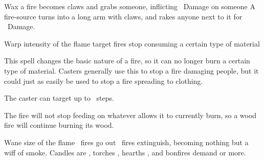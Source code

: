   {\mFire}%
  {Wax}%
  {\detailed}%
  {}%
  {a fire becomes claws and grabs someone, inflicting \rollConv\ Damage on someone}%
  {
    A fire-source turns into a long arm with claws, and rakes anyone next to it for \rollConv~Damage.
  }

  {\mFire}%
  {Warp}%
  {\duplicated}%
  {intensity of the flame}%
  {target fires stop consuming a certain type of material}%
  {
    This spell changes the basic nature of a fire, so it can no longer burn a certain type of material.
    Casters generally use this to stop a fire damaging people, but it could just as easily be used to stop a fire spreading to clothing.

    The caster can target up to \spellArea\ steps.

    The fire will not stop feeding on whatever allows it to currently burn, so a wood fire will continue burning its wood.
  }

  {\mFire}%
  {Wane}%
  {\duplicated}%
  {size of the flame}%
  {\spellArea\ fires go out}%
  {
    \spellArea\ fires extinguish, becoming nothing but a wiff of smoke.
    Candles are , torches , hearths , and bonfires demand  or more.
  }
